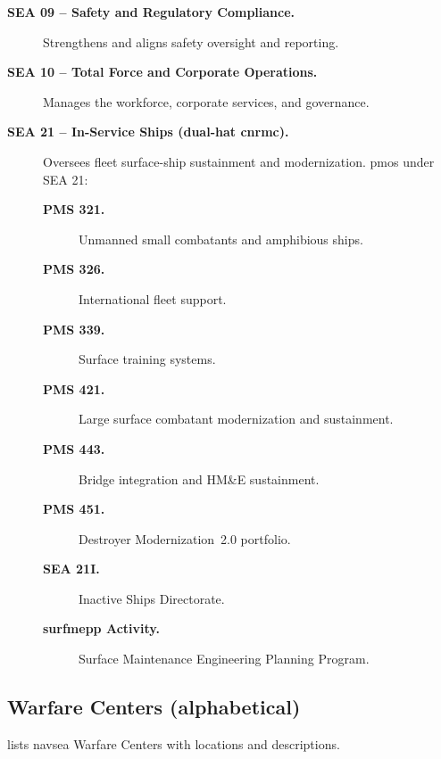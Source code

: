 \documentclass[../main.tex]{subfiles}
\begin{document}
\begin{description}
	\item[\textbf{SEA 09 -- Safety and Regulatory Compliance.}] Strengthens and aligns safety oversight and reporting.
	\item[\textbf{SEA 10 -- Total Force and Corporate Operations.}] Manages the workforce, corporate services, and governance.
	\item[\textbf{SEA 21 -- In-Service Ships (dual-hat \ac{cnrmc}).}] Oversees fleet surface-ship sustainment and modernization. \acp{pmo} under SEA 21:
      \begin{description}
        \item[\textbf{PMS 321.}] Unmanned small combatants and amphibious ships.
        \item[\textbf{PMS 326.}] International fleet support.
        \item[\textbf{PMS 339.}] Surface training systems.
        \item[\textbf{PMS 421.}] Large surface combatant modernization and sustainment.
        \item[\textbf{PMS 443.}] Bridge integration and HM\&E sustainment.
        \item[\textbf{PMS 451.}] Destroyer Modernization~2.0 portfolio.
        \item[\textbf{SEA 21I.}] Inactive Ships Directorate.
        \item[\textbf{\ac{surfmepp} Activity.}] Surface Maintenance Engineering Planning Program.
      \end{description}
\end{description}

\subsection{Warfare Centers (alphabetical)}

\Tab{\ref{tab:navsea-centers}} lists \ac{navsea} Warfare Centers with locations and descriptions.
\end{document}

